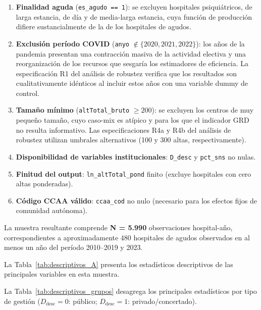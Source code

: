 \begin{enumerate}
  \item \textbf{Finalidad aguda} (\texttt{es\_agudo == 1}): se excluyen hospitales psiquiátricos, de larga estancia, de día y de media-larga estancia, cuya función de producción difiere sustancialmente de la de los hospitales de agudos.
  \item \textbf{Exclusión período COVID} (\texttt{anyo} $\notin \{2020, 2021, 2022\}$): los años de la pandemia presentan una contracción masiva de la actividad electiva y una reorganización de los recursos que sesgaría los estimadores de eficiencia. La especificación R1 del análisis de robustez verifica que los resultados son cualitativamente idénticos al incluir estos años con una variable dummy de control.
  \item \textbf{Tamaño mínimo} (\texttt{altTotal\_bruto} $\geq 200$): se excluyen los centros de muy pequeño tamaño, cuyo caso-mix es atípico y para los que el indicador GRD no resulta informativo. Las especificaciones R4a y R4b del análisis de robustez utilizan umbrales alternativos (100 y 300 altas, respectivamente).
  \item \textbf{Disponibilidad de variables institucionales}: \texttt{D\_desc} y \texttt{pct\_sns} no nulas.
  \item \textbf{Finitud del output}: \texttt{ln\_altTotal\_pond} finito (excluye hospitales con cero altas ponderadas).
  \item \textbf{Código CCAA válido}: \texttt{ccaa\_cod} no nulo (necesario para los efectos fijos de comunidad autónoma).
\end{enumerate}

La muestra resultante comprende \textbf{N = 5.990} observaciones hospital-año, correspondientes a aproximadamente 480 hospitales de agudos observados en al menos un año del período 2010–2019 y 2023.

La Tabla~\ref{tab:descriptivos_A} presenta los estadísticos descriptivos de las principales variables en esta muestra.

\begin{table}[htbp]
\centering
\caption{Estadísticos descriptivos — Muestra Diseño A (N = 5.990)}
\label{tab:descriptivos_A}
\small

\end{table}

La Tabla~\ref{tab:descriptivos_grupos} desagrega los principales estadísticos por tipo de gestión (\(D_{\text{desc}} = 0\): público; \(D_{\text{desc}} = 1\): privado/concertado).

\begin{table}[htbp]
\centering
\caption{Estadísticos descriptivos por grupo de gestión}
\label{tab:descriptivos_grupos}
\small

\end{table}
